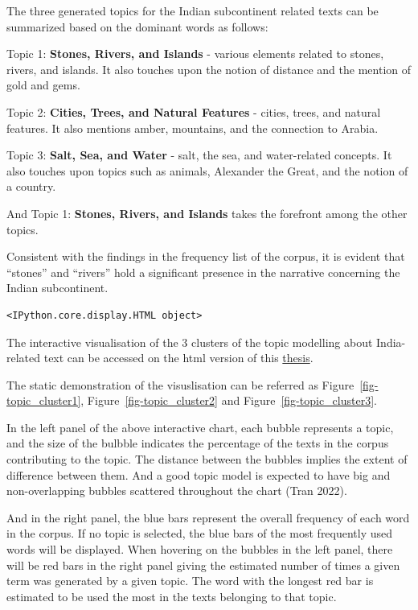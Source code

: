 \documentclass[
  12pt,
]{article}
\begin{document}
The three generated topics for the Indian subcontinent related texts can
be summarized based on the dominant words as follows:

Topic 1: \textbf{Stones, Rivers, and Islands} - various elements related
to stones, rivers, and islands. It also touches upon the notion of
distance and the mention of gold and gems.

Topic 2: \textbf{Cities, Trees, and Natural Features} - cities, trees,
and natural features. It also mentions amber, mountains, and the
connection to Arabia.

Topic 3: \textbf{Salt, Sea, and Water} - salt, the sea, and
water-related concepts. It also touches upon topics such as animals,
Alexander the Great, and the notion of a country.

And Topic 1: \textbf{Stones, Rivers, and Islands} takes the forefront
among the other topics.

Consistent with the findings in the frequency list of the corpus, it is
evident that ``stones'' and ``rivers'' hold a significant presence in
the narrative concerning the Indian subcontinent.

\begin{verbatim}
<IPython.core.display.HTML object>
\end{verbatim}

The interactive visualisation of the 3 clusters of the topic modelling
about India-related text can be accessed on the html version of this
\href{https://raw.githack.com/lizaodawn/NH_thesis/main/NHthesis.html}{thesis}.

The static demonstration of the visuslisation can be referred as
Figure~\ref{fig-topic_cluster1}, Figure~\ref{fig-topic_cluster2} and
Figure~\ref{fig-topic_cluster3}.

In the left panel of the above interactive chart, each bubble represents
a topic, and the size of the bulbble indicates the percentage of the
texts in the corpus contributing to the topic. The distance between the
bubbles implies the extent of difference between them. And a good topic
model is expected to have big and non-overlapping bubbles scattered
throughout the chart (Tran 2022).

And in the right panel, the blue bars represent the overall frequency of
each word in the corpus. If no topic is selected, the blue bars of the
most frequently used words will be displayed. When hovering on the
bubbles in the left panel, there will be red bars in the right panel
giving the estimated number of times a given term was generated by a
given topic. The word with the longest red bar is estimated to be used
the most in the texts belonging to that topic.
\end{document}

